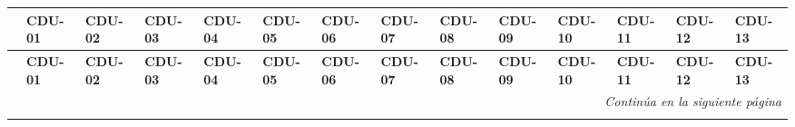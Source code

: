 \begin{center}
\begin{longtable}{ c | p{0.75cm} p{0.75cm} p{0.75cm} p{0.75cm} p{0.75cm} p{0.75cm} p{0.75cm} p{0.75cm} p{0.75cm} p{0.75cm} p{0.75cm} p{0.75cm} p{0.75cm} }

	& \textbf{CDU-01} & \textbf{CDU-02} & \textbf{CDU-03} & \textbf{CDU-04} & \textbf{CDU-05} & \textbf{CDU-06} & \textbf{CDU-07} & \textbf{CDU-08} & \textbf{CDU-09} & \textbf{CDU-10} & \textbf{CDU-11} & \textbf{CDU-12} & \textbf{CDU-13} \\ \hline \hline
	\endfirsthead
	& \textbf{CDU-01} & \textbf{CDU-02} & \textbf{CDU-03} & \textbf{CDU-04} & \textbf{CDU-05} & \textbf{CDU-06} & \textbf{CDU-07} & \textbf{CDU-08} & \textbf{CDU-09} & \textbf{CDU-10} & \textbf{CDU-11} & \textbf{CDU-12} & \textbf{CDU-13} \\ \hline \hline
	\endhead

	\multicolumn{14}{r}{\textit{Continúa en la siguiente página}} \\
	\endfoot
	\endlastfoot


\end{longtable}
\end{center}
